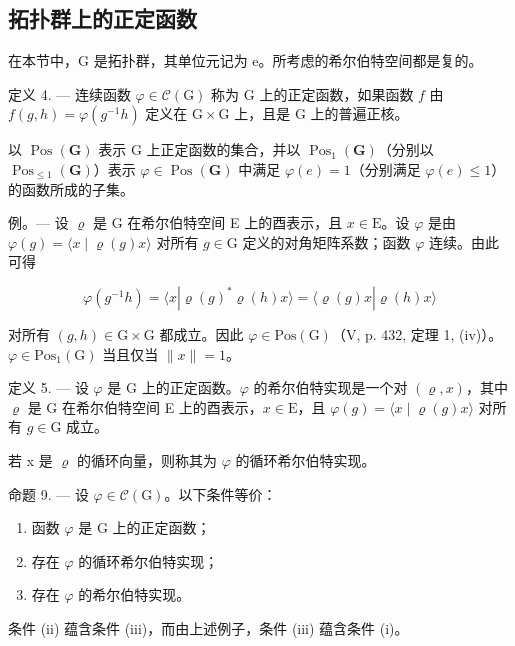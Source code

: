 \subsection{拓扑群上的正定函数}

在本节中，G 是拓扑群，其单位元记为 e。所考虑的希尔伯特空间都是复的。

定义 4. --- 连续函数 \(\varphi\in\mathcal{C}(\mathrm{G})\) 称为 G 上的正定函数，如果函数 \(f\) 由 \(f(g,h)=\varphi(g^{-1}h)\) 定义在 \(\mathrm{G}\times\mathrm{G}\) 上，且是 \(\mathrm{G}\) 上的普遍正核。

以 \(\operatorname{Pos}(\mathbf{G})\) 表示 G 上正定函数的集合，并以 \(\operatorname{Pos}_{1}(\mathbf{G})\)（分别以 \(\operatorname{Pos}_{\leqslant1}(\mathbf{G})\)）表示 \(\varphi\in\operatorname{Pos}(\mathbf{G})\) 中满足 \(\varphi(e)=1\)（分别满足 \(\varphi(e)\leqslant1\)）的函数所成的子集。

例。--- 设 \(\varrho\) 是 G 在希尔伯特空间 E 上的酉表示，且 \(x \in \mathrm{E}\)。设 \(\varphi\) 是由 \(\varphi(g) = \langle x \mid \varrho(g)x \rangle\) 对所有 \(g \in \mathrm{G}\) 定义的对角矩阵系数；函数 \(\varphi\) 连续。由此可得

\[
\varphi (g ^ {- 1} h) = \langle x | \varrho (g) ^ {*} \varrho (h) x \rangle = \langle \varrho (g) x | \varrho (h) x \rangle
\]

对所有 \((g,h)\in\mathrm{G}\times\mathrm{G}\) 都成立。因此 \(\varphi\in\mathrm{Pos}(\mathrm{G})\)（V, p. 432, 定理 1, (iv)）。\(\varphi\in\mathrm{Pos}_{1}(\mathrm{G})\) 当且仅当 \(\|x\|=1\)。

定义 5. --- 设 \(\varphi\) 是 G 上的正定函数。\(\varphi\) 的希尔伯特实现是一个对 \((\varrho, x)\)，其中 \(\varrho\) 是 G 在希尔伯特空间 E 上的酉表示，\(x \in \mathrm{E}\)，且 \(\varphi(g) = \langle x \mid \varrho(g)x \rangle\) 对所有 \(g \in \mathrm{G}\) 成立。

若 x 是 \(\varrho\) 的循环向量，则称其为 \(\varphi\) 的循环希尔伯特实现。

命题 9. --- 设 \(\varphi\in\mathcal{C}(\mathrm{G})\)。以下条件等价：

\begin{enumerate}
\def\labelenumi{(\roman{enumi})}
\item
  函数 \(\varphi\) 是 G 上的正定函数；
\item
  存在 \(\varphi\) 的循环希尔伯特实现；
\item
  存在 \(\varphi\) 的希尔伯特实现。
\end{enumerate}

条件 (ii) 蕴含条件 (iii)，而由上述例子，条件 (iii) 蕴含条件 (i)。

